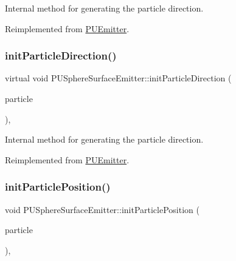 Internal method for generating the particle direction. 

Reimplemented from \hyperlink{classPUEmitter_a0dffa0a17008ddaaec73c6042ea1a019}{P\+U\+Emitter}.

\mbox{\label{classPUSphereSurfaceEmitter_ae3cf2112066b7107ad740d1a70fd52ef}} 
\subsubsection{\texorpdfstring{init\+Particle\+Direction()}{initParticleDirection()}\hspace{0.1cm}{\footnotesize\ttfamily [2/2]}}
{\footnotesize\ttfamily virtual void P\+U\+Sphere\+Surface\+Emitter\+::init\+Particle\+Direction (\begin{DoxyParamCaption}\item[{\hyperlink{structPUParticle3D}{P\+U\+Particle3D} $\ast$}]{particle }\end{DoxyParamCaption})\hspace{0.3cm}{\ttfamily [override]}, {\ttfamily [virtual]}}

Internal method for generating the particle direction. 

Reimplemented from \hyperlink{classPUEmitter_a0dffa0a17008ddaaec73c6042ea1a019}{P\+U\+Emitter}.

\mbox{\label{classPUSphereSurfaceEmitter_aa727aa40576357ab1e2577ae9e47937a}} 
\subsubsection{\texorpdfstring{init\+Particle\+Position()}{initParticlePosition()}\hspace{0.1cm}{\footnotesize\ttfamily [1/2]}}
{\footnotesize\ttfamily void P\+U\+Sphere\+Surface\+Emitter\+::init\+Particle\+Position (\begin{DoxyParamCaption}\item[{\hyperlink{structPUParticle3D}{P\+U\+Particle3D} $\ast$}]{particle }\end{DoxyParamCaption})\hspace{0.3cm}{\ttfamily [override]}, {\ttfamily [virtual]}}

